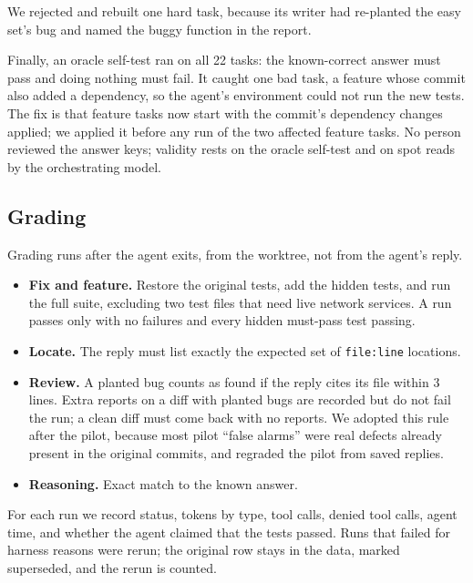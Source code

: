 We rejected and rebuilt one hard task, because its writer had re-planted
the easy set's bug and named the buggy function in the report.

Finally, an oracle self-test ran on all 22 tasks: the known-correct answer
must pass and doing nothing must fail. It caught one bad task, a feature
whose commit also added a dependency, so the agent's environment could not
run the new tests. The fix is that feature tasks now start with the
commit's dependency changes applied; we applied it before any run of the
two affected feature tasks. No person reviewed the answer keys; validity
rests on the oracle self-test and on spot reads by the orchestrating model.

\subsection{Grading}
\label{sec:grading}

Grading runs after the agent exits, from the worktree, not from the
agent's reply.

\begin{itemize}
  \item \textbf{Fix and feature.} Restore the original tests, add the
        hidden tests, and run the full suite, excluding two test files that
        need live network services. A run passes only with no failures and
        every hidden must-pass test passing.
  \item \textbf{Locate.} The reply must list exactly the expected set of
        \texttt{file:line} locations.
  \item \textbf{Review.} A planted bug counts as found if the reply cites
        its file within 3 lines. Extra reports on a diff with planted bugs
        are recorded but do not fail the run; a clean diff must come back
        with no reports. We adopted this rule after the pilot, because most
        pilot ``false alarms'' were real defects already present in the
        original commits, and regraded the pilot from saved replies.
  \item \textbf{Reasoning.} Exact match to the known answer.
\end{itemize}

For each run we record status, tokens by type, tool calls, denied tool
calls, agent time, and whether the agent claimed that the tests passed.
Runs that failed for harness reasons were rerun; the original row stays in
the data, marked superseded, and the rerun is counted.

